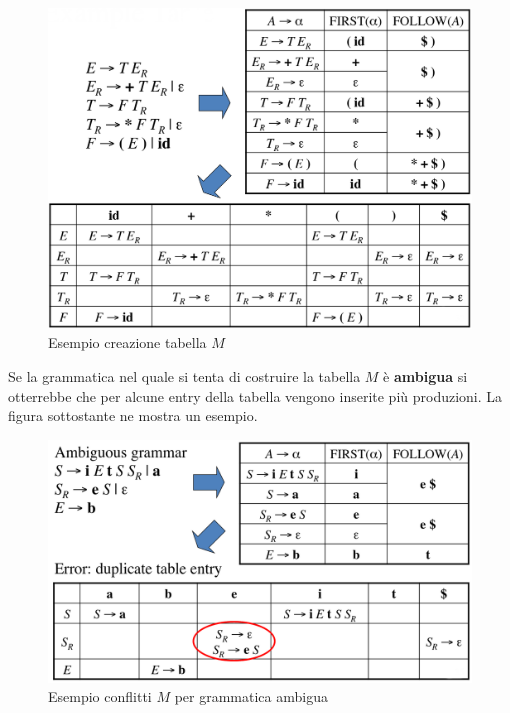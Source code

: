 \begin{figure}[H]
\begin{center}
\includegraphics[scale=0.3]{res/image/example_create_M}
\end{center}
\caption{Esempio creazione tabella $M$}
\label{img:example_create_M}
\end{figure}

Se la grammatica nel quale si tenta di costruire la tabella $M$ \`e
\textbf{ambigua} si otterrebbe che per alcune entry della tabella vengono
inserite pi\`u produzioni. La figura sottostante ne mostra un esempio.

\begin{figure}[H]
\begin{center}
\includegraphics[scale=0.3]{res/image/conflict_in_M}
\end{center}
\caption{Esempio conflitti $M$ per grammatica ambigua}
\label{img:conflict_in_M}
\end{figure}


